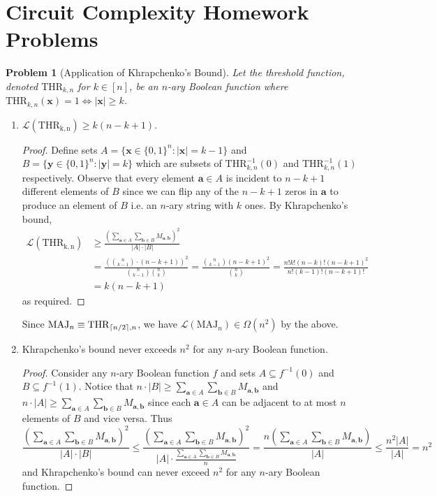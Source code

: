 \documentclass[11pt]{article}
\newcommand\leafsize{\mathcal{L}}
\newcommand\ff[1]{\mathrm{#1}}
\newcommand\vv[1]{\mathbf{#1}}
\newtheorem{problem}{Problem}
\DeclarePairedDelimiter\ceil{\lceil}{\rceil}
\begin{document}
\rhead{\today}

\section*{Circuit Complexity Homework Problems}

\begin{problem}[Application of Khrapchenko's Bound]
	Let the threshold function, denoted $\ff{THR}_{k,n}$ for $k \in [n]$, be an $n$-ary Boolean function where $\ff{THR}_{k,n}(\vv{x}) = 1 \iff |\vv{x}| \geq k$. 
\end{problem}
\begin{enumerate}
	\item $\leafsize(\ff{THR_{k,n}}) \geq k(n-k+1)$.
	\begin{proof}
		Define sets $A = \{\vv{x} \in \{0,1\}^n: |\vv{x}| = k-1 \}$ and $B = \{\vv{y} \in \{0,1\}^n: |\vv{y}| = k\}$ which are subsets of $\ff{THR}_{k,n}^{-1}(0)$ and $\ff{THR}_{k,n}^{-1}(1)$ respectively. Observe that every element $\vv{a} \in A$ is incident to $n-k+1$ different elements of $B$ since we can flip any of the $n-k+1$ zeros in $\vv{a}$ to produce an element of $B$ i.e. an $n$-ary string with $k$ ones. By Khrapchenko's bound,
		\begin{align*}
			\leafsize(\ff{THR_{k,n}}) &\geq \frac{\left(\sum_{\vv{a} \in A}\sum_{\vv{b} \in B} M_{\vv{a}, \vv{b}}\right)^2}{|A|\cdot|B|}\\ 
			&=\frac{\left(\binom{n}{k-1}\cdot(n-k+1)\right)^2}{\binom{n}{k-1}\binom{n}{k}} = \frac{\binom{n}{k-1}(n-k+1)^2}{\binom{n}{k}} =\frac{n!k!(n-k)!(n-k+1)^2}{n!(k-1)!(n-k+1)!}\\
			&= k(n-k+1)
		\end{align*}
		as required.
	\end{proof}
	Since $\ff{MAJ}_n \equiv \ff{THR}_{\ceil{n/2}, n}$, we have $\leafsize(\ff{MAJ}_n) \in \Omega(n^2)$ by the above.
	\item Khrapchenko's bound never exceeds $n^2$ for any $n$-ary Boolean function.
	\begin{proof}
		Consider any $n$-ary Boolean function $f$ and sets $A \subseteq f^{-1}(0)$ and $B \subseteq f^{-1}(1)$. Notice that $n\cdot|B| \geq \sum_{\vv{a} \in A}\sum_{\vv{b} \in B} M_{\vv{a}, \vv{b}}$ and $n\cdot|A| \geq \sum_{\vv{a} \in A}\sum_{\vv{b} \in B} M_{\vv{a}, \vv{b}}$ since each $\vv{a} \in A$ can be adjacent to at most $n$ elements of $B$ and vice versa. Thus 
		\[\frac{\left(\sum_{\vv{a} \in A}\sum_{\vv{b} \in B} M_{\vv{a}, \vv{b}}\right)^2}{|A|\cdot|B|} \leq  \frac{\left(\sum_{\vv{a} \in A}\sum_{\vv{b} \in B} M_{\vv{a}, \vv{b}}\right)^2}{|A| \cdot \frac{\sum_{\vv{a} \in A}\sum_{\vv{b} \in B} M_{\vv{a}, \vv{b}}}{n}} = \frac{n\left(\sum_{\vv{a} \in A}\sum_{\vv{b} \in B} M_{\vv{a}, \vv{b}}\right)}{|A|} \leq \frac{n^2|A|}{|A|} = n^2\]
		and Khrapchenko's bound can never exceed $n^2$ for any $n$-ary Boolean function.
	\end{proof}
\end{enumerate}
\end{document}
